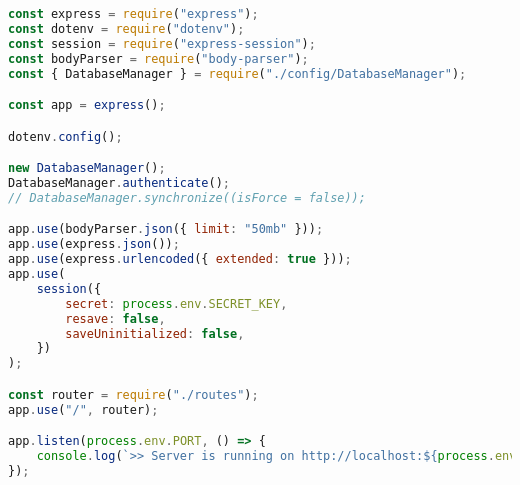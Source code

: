 \begin{lstlisting}[language=Javascript,caption={Request Data untuk Endpoint `POST /generate`}]
const express = require("express");
const dotenv = require("dotenv");
const session = require("express-session");
const bodyParser = require("body-parser");
const { DatabaseManager } = require("./config/DatabaseManager");

const app = express();

dotenv.config();

new DatabaseManager();
DatabaseManager.authenticate();
// DatabaseManager.synchronize((isForce = false));

app.use(bodyParser.json({ limit: "50mb" }));
app.use(express.json());
app.use(express.urlencoded({ extended: true }));
app.use(
	session({
		secret: process.env.SECRET_KEY,
		resave: false,
		saveUninitialized: false,
	})
);

const router = require("./routes");
app.use("/", router);

app.listen(process.env.PORT, () => {
	console.log(`>> Server is running on http://localhost:${process.env.PORT}`);
});
\end{lstlisting}